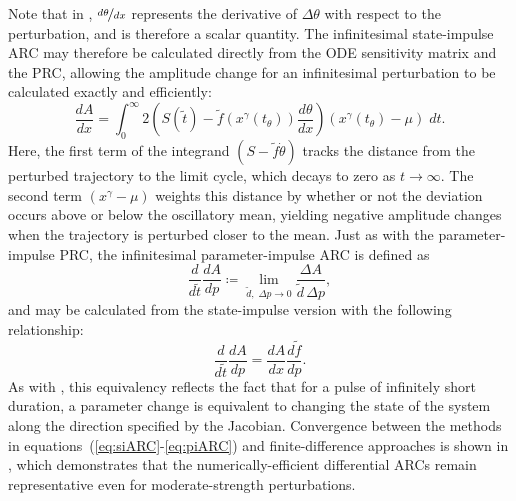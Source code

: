 Note that in , $\nicefrac{d\theta}{dx}$ represents the derivative of $\Delta\theta$ with respect to the perturbation, and is therefore a scalar quantity.
The infinitesimal state-impulse ARC may therefore be calculated directly from the ODE sensitivity matrix and the PRC, allowing the amplitude change for an infinitesimal perturbation to be calculated exactly and efficiently:
\begin{equation}
  \frac{dA}{dx} = \int_0^\infty 2\left(S(\tilde{t}) - \tilde{f}(x^\gamma(t_\theta))\frac{d\theta}{dx}\right)\left(x^\gamma(t_\theta) - \mu\right) \; dt.
  \label{eq:siARC}
\end{equation}
Here, the first term of the integrand $(S - \tilde{f}\dot{\theta})$ tracks the distance from the perturbed trajectory to the limit cycle, which decays to zero as $t \to \infty$.
The second term $(x^\gamma - \mu)$ weights this distance by whether or not the deviation occurs above or below the oscillatory mean, yielding negative amplitude changes when the trajectory is perturbed closer to the mean.
Just as with the parameter-impulse PRC, the infinitesimal parameter-impulse ARC is defined as
\begin{equation}
  \frac{d}{d\tilde{t}}\frac{dA}{dp} \coloneqq \lim_{\tilde{d},\; \Delta p \to 0} \frac{\Delta A}{\tilde{d}\, \Delta p},
\end{equation}
and may be calculated from the state-impulse version with the following relationship:
\begin{equation}
  \frac{d}{d\tilde{t}}\frac{dA}{dp} = \frac{dA}{dx}\frac{d\tilde{f}}{dp}.
    \label{eq:piARC}
\end{equation}
As with , this equivalency reflects the fact that for a pulse of infinitely short duration, a parameter change is equivalent to changing the state of the system along the direction specified by the Jacobian.
Convergence between the methods in equations~(\ref{eq:siARC}-\ref{eq:piARC}) and finite-difference approaches is shown in , which demonstrates that the numerically-efficient differential ARCs remain representative even for moderate-strength perturbations.

